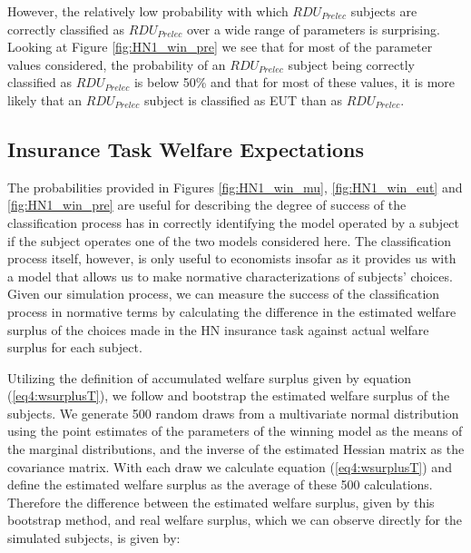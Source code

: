 \documentclass[../main.tex]{subfiles}
\begin{document}
However, the relatively low probability with which $\mathit{RDU_{Prelec}}$ subjects are correctly classified as $\mathit{RDU_{Prelec}}$ over a wide range of parameters is surprising.
Looking at Figure \ref{fig:HN1_win_pre} we see that for most of the parameter values considered, the probability of an $\mathit{RDU_{Prelec}}$ subject being correctly classified as $\mathit{RDU_{Prelec}}$ is below 50\% and that for most of these values, it is more likely that an $\mathit{RDU_{Prelec}}$ subject is classified as EUT than as $\mathit{RDU_{Prelec}}$.


\subsection{\texorpdfstring{\textcite{Harrison2016}}{Harrison and Ng (2016)} Insurance Task Welfare Expectations}
\label{sec4:WT}

The probabilities provided in Figures \ref{fig:HN1_win_mu}, \ref{fig:HN1_win_eut} and \ref{fig:HN1_win_pre} are useful for describing the degree of success of the classification process has in correctly identifying the model operated by a subject if the subject operates one of the two models considered here.
The classification process itself, however, is only useful to economists insofar as it provides us with a model that allows us to make normative characterizations of subjects' choices.
Given our simulation process, we can measure the success of the classification process in normative terms by calculating the difference in the estimated welfare surplus of the choices made in the HN insurance task against actual welfare surplus for each subject.

Utilizing the definition of accumulated welfare surplus given by equation (\ref{eq4:wsurplusT}), we follow \textcite[110-111]{Harrison2016} and bootstrap the estimated welfare surplus of the subjects.
We generate 500 random draws from a multivariate normal distribution using the point estimates of the parameters of the winning model as the means of the marginal distributions, and the inverse of the estimated Hessian matrix as the covariance matrix.{\footnotemark}
With each draw we calculate equation (\ref{eq4:wsurplusT}) and define the estimated welfare surplus as the average of these 500 calculations.
Therefore the difference between the estimated welfare surplus, given by this bootstrap method, and real welfare surplus, which we can observe directly for the simulated subjects, is given by:
\end{document}
